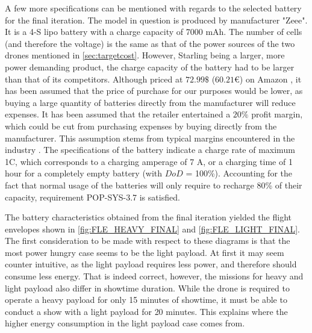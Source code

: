 A few more specifications can be mentioned with regards to the selected battery for the final iteration. The model in question is produced by manufacturer "Zeee". It is a 4-S lipo battery with a charge capacity of 7000 mAh. The number of cells (and therefore the voltage) is the same as that of the power sources of the two drones mentioned in \autoref{sec:targetcost}. However, Starling being a larger, more power demanding product, the charge capacity of the battery had to be larger than that of its competitors. Although priced at $72.99 \$$ ($60.21 €$) on Amazon \cite{amazon_battery}, it has been assumed that the price of purchase for our purposes would be lower, as buying a large quantity of batteries directly from the manufacturer will reduce expenses. It has been assumed that the retailer entertained a $20 \%$ profit margin, which could be cut from purchasing expenses by buying directly from the manufacturer. This assumption stems from typical margins encountered in the industry \cite{jhaveri_jagtap_2017}. The specifications of the battery indicate a charge rate of maximum 1C, which corresponds to a charging amperage of 7 A, or a charging time of 1 hour for a completely empty battery (with $DoD$ = 100\%). Accounting for the fact that normal usage of the batteries will only require to recharge 80\% of their capacity, requirement POP-SYS-3.7 is satisfied.

The battery characteristics obtained from the final iteration yielded the flight envelopes shown in \autoref{fig:FLE_HEAVY_FINAL} and \autoref{fig:FLE_LIGHT_FINAL}. The first consideration to be made with respect to these diagrams is that the most power hungry case seems to be the light payload. At first it may seem counter intuitive, as the light payload requires less power, and therefore should consume less energy. That is indeed correct, however, the missions for heavy and light payload also differ in showtime duration. While the drone is required to operate a heavy payload for only 15 minutes of showtime, it must be able to conduct a show with a light payload for 20 minutes. This explains where the higher energy consumption in the light payload case comes from.

